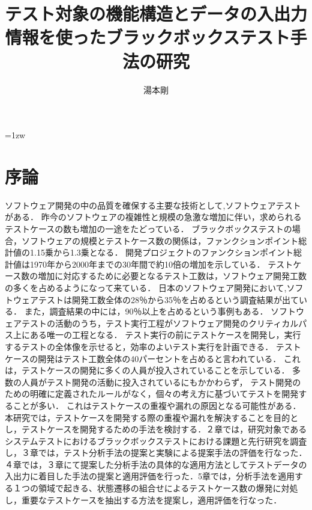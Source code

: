 \documentclass[a4paper,12pt]{jreport}
\title{テスト対象の機能構造とデータの入出力情報を使ったブラックボックステスト手法の研究}
\author{湯本剛}
\begin{document}
\maketitle
\thispagestyle{empty}
\newpage

\thispagestyle{empty}
\vspace*{20pt plus 1fil}
\parindent=1zw
\noindent


\par
\vspace{0pt plus 1fil}
\newpage

\tableofcontents
\listoffigures
\listoftables

\pagebreak \setcounter{page}{1}

\chapter{序論}
ソフトウェア開発の中の品質を確保する主要な技術として,ソフトウェアテストがある．
昨今のソフトウェアの複雑性と規模の急激な増加に伴い，求められるテストケースの数も増加の一途をたどっている．
ブラックボックステストの場合，ソフトウェアの規模とテストケース数の関係は，ファンクションポイント総計値の1.15乗から1.3乗となる\cite{jones1998estimating}．
開発プロジェクトのファンクションポイント総計値は1970年から2000年までの30年間で約10倍の増加を示している\cite{longstreet2000}．
テストケース数の増加に対応するために必要となるテスト工数は，ソフトウェア開発工数の多くを占めるようになって来ている．
日本のソフトウェア開発において,ソフトウェアテストは開発工数全体の28％から35％を占めるという調査結果が出ている．
また，調査結果の中には，90％以上を占めるという事例もある\cite{IPA2015}．
ソフトウェアテストの活動のうち，テスト実行工程がソフトウェア開発のクリティカルパス上にある唯一の工程となる．
テスト実行の前にテストケースを開発し，実行するテストの全体像を示せると，効率のよいテスト実行を計画できる．
テストケースの開発はテスト工数全体の40パーセントを占めると言われている\cite{van2013tpi}．
これは，テストケースの開発に多くの人員が投入されていることを示している．
多数の人員がテスト開発の活動に投入されているにもかかわらず， テスト開発のための明確に定義されたルールがなく，個々の考え方に基づいてテストを開発することが多い．
これはテストケースの重複や漏れの原因となる可能性がある．
本研究では，テストケースを開発する際の重複や漏れを解決することを目的とし，テストケースを開発するための手法を検討する．２章では，研究対象であるシステムテストにおけるブラックボックステストにおける課題と先行研究を調査し，３章では，テスト分析手法の提案と実験による提案手法の評価を行なった．４章では，３章にて提案した分析手法の具体的な適用方法としてテストデータの入出力に着目した手法の提案と適用評価を行った．5章では，分析手法を適用する１つの領域で起きる、状態遷移の組合せによるテストケース数の爆発に対処し，重要なテストケースを抽出する方法を提案し，適用評価を行なった．
\end{document}
